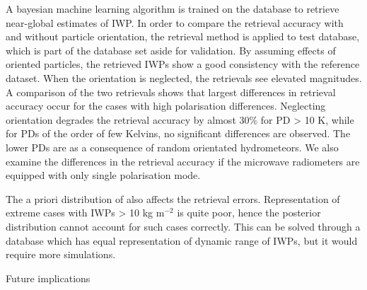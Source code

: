 \documentclass[amt, manuscript]{copernicus}
\newcommand{\todo}[1]{{\color{red} #1}}
\begin{document}
A bayesian machine learning algorithm is trained on the database to retrieve near-global estimates of IWP. In order to compare the retrieval accuracy with and without particle orientation, the retrieval method is applied to test database, which is part of the database set aside for validation. By assuming effects of oriented particles, the retrieved IWPs  show a good consistency with the reference dataset. When the orientation is neglected, the retrievals see elevated magnitudes. A comparison of the two retrievals shows that largest differences in retrieval accuracy occur for the cases with high polarisation differences. Neglecting orientation degrades the retrieval accuracy by almost 30\% for PD > 10\,\,K, while for PDs of the order of few Kelvins, no significant differences are observed. The lower PDs are as a consequence of random orientated hydrometeors. We also examine the differences in the retrieval accuracy if the microwave radiometers are equipped with only single polarisation mode. 

The a priori distribution of also affects the retrieval errors. Representation of extreme cases with IWPs > 10\,\,kg m$^{-2}$ is quite poor, hence the posterior distribution cannot account for such cases correctly. This can be solved through a database which has equal representation of dynamic range of IWPs, but it would require more simulations. 

\todo{Future implications}




 
















\end{document}
